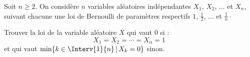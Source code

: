\documentclass[a4paper,10pt]{report}
\begin{document}
\begin{enumerate}
\begin{enumerate}
\end{enumerate}




%
%
%
%
\end{enumerate}

\begin{Exercice}{} Soit $n \geq 2$. On considère $n$ variables aléatoires indépendantes $X_1$, $X_2$, $\ldots$ et $X_n$, suivant chacune une loi de Bernoulli de paramètres respectifs $1$, $\tfrac{1}{2}$, $\ldots$ et $\tfrac{1}{n}\cdot$

\noindent Trouver la loi de la variable aléatoire $X$ qui vaut $0$ si :
$$ X_1= X_2= \cdots = X_n = 1$$
et qui vaut $\min \lbrace k \in \Interv{1}{n} \, \vert \, X_k =0 \rbrace$ sinon.
\end{Exercice} 
\end{document}
